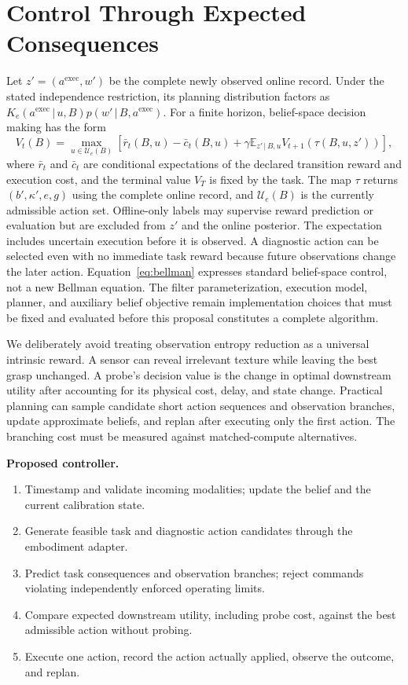 \documentclass[11pt]{article}
\newcommand{\E}{\mathbb{E}}
\newcommand{\given}{\,\vert\,}
\begin{document}
\section{Control Through Expected Consequences}
Let $z'=(a^{\mathrm{exec}},w')$ be the complete newly observed online record. Under the stated independence restriction, its planning distribution factors as $K_e(a^{\mathrm{exec}}\given u,B)p(w'\given B,a^{\mathrm{exec}})$. For a finite horizon, belief-space decision making has the form
\begin{equation}
V_t(B)=\max_{u\in\mathcal U_e(B)}\left[
\bar r_t(B,u)-\bar c_t(B,u)+\gamma\E_{z'\given B,u}V_{t+1}(\tau(B,u,z'))\right],
\label{eq:bellman}
\end{equation}
where $\bar r_t$ and $\bar c_t$ are conditional expectations of the declared transition reward and execution cost, and the terminal value $V_T$ is fixed by the task. The map $\tau$ returns $(b',\kappa',e,g)$ using the complete online record, and $\mathcal U_e(B)$ is the currently admissible action set. Offline-only labels may supervise reward prediction or evaluation but are excluded from $z'$ and the online posterior. The expectation includes uncertain execution before it is observed. A diagnostic action can be selected even with no immediate task reward because future observations change the later action. Equation~\ref{eq:bellman} expresses standard belief-space control, not a new Bellman equation. The filter parameterization, execution model, planner, and auxiliary belief objective remain implementation choices that must be fixed and evaluated before this proposal constitutes a complete algorithm.

We deliberately avoid treating observation entropy reduction as a universal intrinsic reward. A sensor can reveal irrelevant texture while leaving the best grasp unchanged. A probe's decision value is the change in optimal downstream utility after accounting for its physical cost, delay, and state change. Practical planning can sample candidate short action sequences and observation branches, update approximate beliefs, and replan after executing only the first action. The branching cost must be measured against matched-compute alternatives.

\textbf{Proposed controller.}
\begin{enumerate}
\item Timestamp and validate incoming modalities; update the belief and the current calibration state.
\item Generate feasible task and diagnostic action candidates through the embodiment adapter.
\item Predict task consequences and observation branches; reject commands violating independently enforced operating limits.
\item Compare expected downstream utility, including probe cost, against the best admissible action without probing.
\item Execute one action, record the action actually applied, observe the outcome, and replan.
\end{enumerate}
\end{document}
